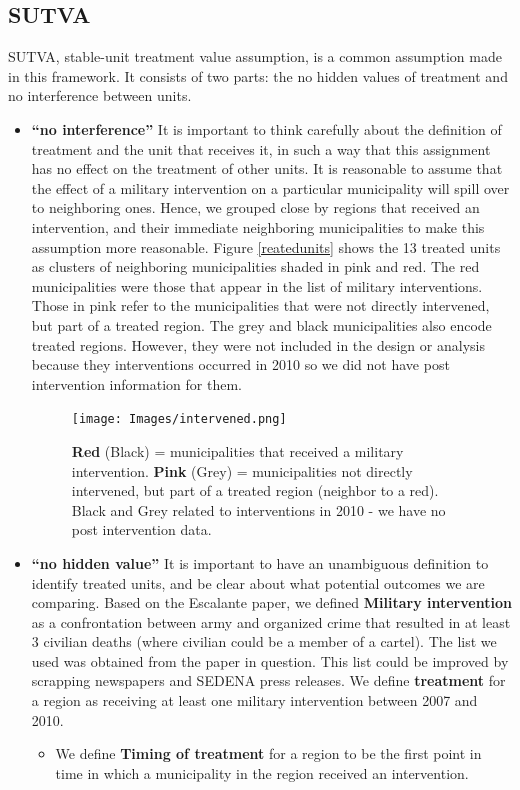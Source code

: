 \documentclass{article}[11 pt]
\begin{document}
\subsection{SUTVA}		
		SUTVA, stable-unit treatment value assumption, is a common assumption made in this framework. It consists of two parts: the no hidden values of treatment and no interference between units.
		\begin{itemize}
			\item \textbf{``no interference''} It is important to think carefully about the definition of treatment and the unit that receives it, in such a way that this assignment has no effect on the treatment of other units. It is reasonable to assume that the effect of a military intervention on a particular municipality will spill over to neighboring ones. Hence, we grouped close by regions that received an intervention, and their immediate neighboring municipalities to make this assumption more reasonable. Figure \ref{reatedunits} shows the 13 treated units as clusters of neighboring municipalities shaded in pink and red. The red municipalities were those that appear in the list of military interventions. Those in pink refer to the municipalities that were not directly intervened, but part of a treated region. The grey and black municipalities also encode treated regions. However, they were not included in the design or analysis because they interventions occurred in 2010 so we did not have post intervention information for them. 
			\begin{figure}[htdp]
				\centering
			      \texttt{[image: Images/intervened.png]}
			      \caption{\textbf{Red} (Black) = municipalities that received a military intervention. \newline
			\textbf{Pink} (Grey) = municipalities not directly intervened, but part of a treated region (neighbor to a red).\newline
			 \small{Black and Grey related to interventions in 2010 - we have no post intervention data}.}
			\label{treatedUnits}
			\end{figure}
			
			\item \textbf{``no hidden value''} It is important to have an unambiguous definition to identify treated units, and be clear about what potential outcomes we are comparing. Based on the Escalante paper, we defined \textbf{ Military intervention} as a confrontation between army and organized crime that resulted in at least 3 civilian deaths (where civilian could be a member of a cartel). The list we used was obtained from the paper in question. This list could be improved by scrapping newspapers and SEDENA press releases. We define \textbf{treatment} for a region as receiving at least one military intervention between 2007 and 2010.
			\begin{itemize}
				\item We define \textbf{Timing of treatment} for a region to be the first point in time in which a municipality in the region received an intervention.
			\end{itemize}  			
		\end{itemize}
		
\end{document}

